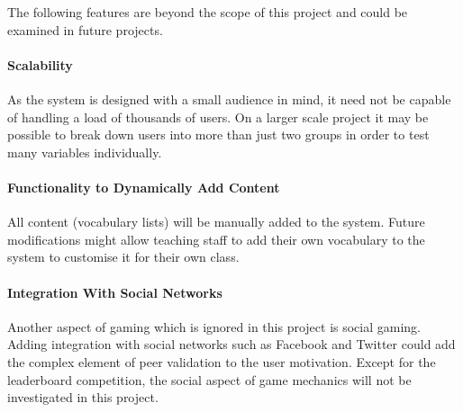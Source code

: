The following features are beyond the scope of this project and could be examined
in future projects.

\paragraph{Scalability}
As the system is designed with a small audience in mind, it need not be capable
of handling a load of thousands of users. On a larger scale project it may be
possible to break down users into more than just two groups in order to test
many variables individually.

\paragraph{Functionality to Dynamically Add Content}
All content (vocabulary lists) will be manually added to the system. Future
modifications might allow teaching staff to add their own vocabulary to the
system to customise it for their own class.

\paragraph{Integration With Social Networks}
Another aspect of gaming which is ignored in this project is social gaming.
Adding integration with social networks such as Facebook and Twitter could add
the complex element of peer validation to the user motivation. Except for the
leaderboard competition, the social aspect of game mechanics will not be 
investigated in this project.
